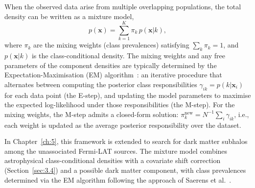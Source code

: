 When the observed data arise from multiple overlapping populations, the total density can be written as a mixture model,
\begin{equation}
	p(\mathbf{x}) = \sum_{k=1}^{K} \pi_k \, p(\mathbf{x}|k),
	\label{eq:mixture_model}
\end{equation}
where $\pi_k$ are the mixing weights (class prevalences) satisfying $\sum_k \pi_k = 1$, and $p(\mathbf{x}|k)$ is the class-conditional density.
The mixing weights and any free parameters of the component densities are typically determined by the Expectation-Maximisation (EM) algorithm~\cite{Dempster:1977}: an iterative procedure that alternates between computing the posterior class responsibilities $\gamma_{ik} = p(k | \mathbf{x}_i)$ for each data point (the E-step), and updating the model parameters to maximise the expected log-likelihood under those responsibilities (the M-step).
For the mixing weights, the M-step admits a closed-form solution: $\pi_k^\mathrm{new} = N^{-1}\sum_i \gamma_{ik}$, i.e., each weight is updated as the average posterior responsibility over the dataset.

In Chapter~\ref{ch:5}, this framework is extended to search for dark matter subhalos among the unassociated Fermi-LAT sources.
The mixture model combines astrophysical class-conditional densities with a covariate shift correction (Section~\ref{sec:3.4}) and a possible dark matter component, with class prevalences determined via the EM algorithm following the approach of Saerens et al.~\cite{10.1162/089976602753284446_Saerens}.
